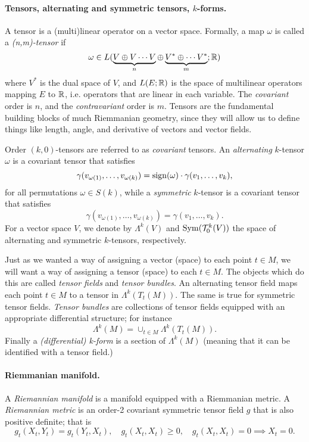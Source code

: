 \documentclass{article}
\begin{document}
	\paragraph{Tensors, alternating and symmetric tensors, $k$-forms.}
	A tensor is a (multi)linear operator on a vector space. Formally, a map $\omega$ is called a \emph{(n,m)-tensor} if 
	$$
	\omega \in L(\underbrace{V \oplus V \cdots V}_{n} \oplus \underbrace{V^{*} \oplus \cdots V^*}_{m};\mathbb{R})
	$$ 
	where $V^*$ is the dual space of $V$, and $L(E;\mathbb{R})$ is the space of multilinear operators mapping $E$ to $\mathbb{R}$, i.e. operators that are linear in each variable. The \emph{covariant} order is $n$, and the \emph{contravariant} order is $m$. Tensors are the fundamental building blocks of much Riemmanian geometry, since they will allow us to define things like length, angle, and derivative of vectors and vector fields. 
	
	Order $(k,0)$-tensors are referred to as \emph{covariant} tensors. An \emph{alternating} $k$-tensor $\omega$ is a covariant tensor that satisfies
	\begin{equation*}
		\gamma(v_{\omega(1)},\ldots,v_{\omega(k)}) = \mathrm{sign}(\omega) \cdot \gamma(v_{1},\ldots,v_{k}),
	\end{equation*}
	for all permutations $\omega \in S(k)$, while a \emph{symmetric} $k$-tensor is a covariant tensor that satisfies
	\begin{equation*}
		\gamma(v_{\omega(1)},\ldots,v_{\omega(k)}) = \gamma(v_{1},\ldots,v_{k}).
	\end{equation*}
	For a vector space $V$, we denote by $\Lambda^k(V)$ and ${\rm Sym}(\mathcal{T}_0^{k}(V))$ the space of alternating and symmetric $k$-tensors, respectively. 
	
	Just as we wanted a way of assigning a vector (space) to each point $t \in M$, we will want a way of assigning a tensor (space) to each $t \in M$. The objects which do this are called \emph{tensor fields} and \emph{tensor bundles}. An alternating tensor field maps each point $t \in M$ to a tensor in $\Lambda^{k}(T_t(M))$. The same is true for symmetric tensor fields. \emph{Tensor bundles} are collections of tensor fields equipped with an appropriate differential structure; for instance
	$$
	\Lambda^k(M) = \cup_{t \in M} \Lambda^k(T_t(M)).
	$$
	Finally a \emph{(differential) k-form} is a section of $\Lambda^k(M)$ (meaning that it can be identified with a tensor field.)
	
	\paragraph{Riemmanian manifold.}
	A \emph{Riemannian manifold} is a manifold equipped with a Riemmanian metric. A \emph{Riemannian metric} is an order-2 covariant symmetric tensor field $g$ that is also positive definite; that is
	$$
	g_t(X_t,Y_t) = g_t(Y_t,X_t), \quad g_t(X_t,X_t) \geq 0, \quad g_t(X_t,X_t) = 0 \implies X_t = 0.
	$$
	
\end{document}
